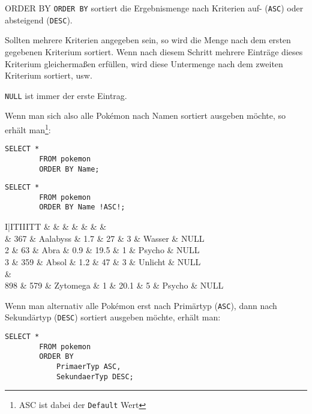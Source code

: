 \begin{sql}{ORDER BY}
    \texttt{ORDER BY} sortiert die Ergebnismenge nach Kriterien auf- (\texttt{ASC}) oder absteigend (\texttt{DESC}).
    
    Sollten mehrere Kriterien angegeben sein, so wird die Menge nach dem ersten gegebenen Kriterium sortiert.
    Wenn nach diesem Schritt mehrere Einträge dieses Kriterium gleichermaßen erfüllen, wird diese Untermenge nach dem zweiten Kriterium sortiert, usw.

    \texttt{NULL} ist immer der erste Eintrag.
    
    Wenn man sich also alle Pokémon nach Namen sortiert ausgeben möchte, so erhält man\footnote{ASC ist dabei der \texttt{Default} Wert}:

    \begin{lstlisting}[style=SqlInputStyle]
        SELECT *
        FROM pokemon
        ORDER BY Name;
    \end{lstlisting}

    \begin{lstlisting}[style=SqlInputStyle]
        SELECT *
        FROM pokemon
        ORDER BY Name !ASC!;
    \end{lstlisting}

    \begin{tabular}{I|ITIIITT}
        &  &  &  &  &  &  &  \\ & 367 & Aalabyss & 1.7 & 27 & 3 & Wasser & NULL \\
        2 & 63 & Abra & 0.9 & 19.5 & 1 & Psycho & NULL \\
        3 & 359 & Absol & 1.2 & 47 & 3 & Unlicht & NULL \\       
         &  \\
        898 & 579 & Zytomega & 1 & 20.1 & 5 & Psycho & NULL \\
    \end{tabular}

    Wenn man alternativ alle Pokémon erst nach Primärtyp (\texttt{ASC}), dann nach Sekundärtyp (\texttt{DESC}) sortiert ausgeben möchte, erhält man:
    
    \begin{lstlisting}[style=SqlInputStyle]
        SELECT *
        FROM pokemon
        ORDER BY
            PrimaerTyp ASC,
            SekundaerTyp DESC;
    \end{lstlisting}


\end{sql}

